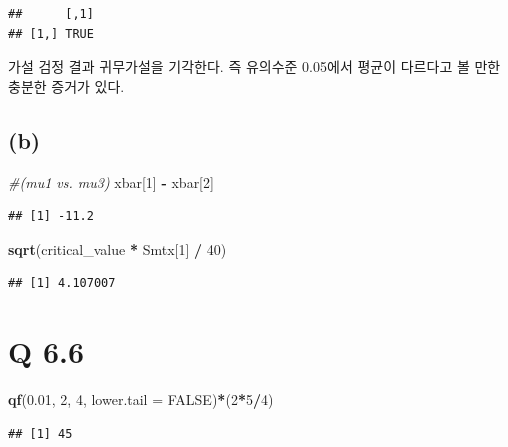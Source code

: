 \documentclass[
]{article}
\newenvironment{Shaded}{\begin{snugshade}}{\end{snugshade}}
\newcommand{\AttributeTok}[1]{\textcolor[rgb]{0.13,0.29,0.53}{#1}}
\newcommand{\CommentTok}[1]{\textcolor[rgb]{0.56,0.35,0.01}{\textit{#1}}}
\newcommand{\ConstantTok}[1]{\textcolor[rgb]{0.56,0.35,0.01}{#1}}
\newcommand{\DecValTok}[1]{\textcolor[rgb]{0.00,0.00,0.81}{#1}}
\newcommand{\FloatTok}[1]{\textcolor[rgb]{0.00,0.00,0.81}{#1}}
\newcommand{\FunctionTok}[1]{\textcolor[rgb]{0.13,0.29,0.53}{\textbf{#1}}}
\newcommand{\NormalTok}[1]{#1}
\newcommand{\SpecialCharTok}[1]{\textcolor[rgb]{0.81,0.36,0.00}{\textbf{#1}}}
\begin{document}
\begin{verbatim}
##      [,1]
## [1,] TRUE
\end{verbatim}

가설 검정 결과 귀무가설을 기각한다. 즉 유의수준 0.05에서 평균이 다르다고
볼 만한 충분한 증거가 있다.

\subsection{(b)}\label{b-1}

\begin{Shaded}
\begin{Highlighting}[]
\CommentTok{\#(mu1 vs. mu3)}
\NormalTok{xbar[}\DecValTok{1}\NormalTok{] }\SpecialCharTok{{-}}\NormalTok{ xbar[}\DecValTok{2}\NormalTok{]}
\end{Highlighting}
\end{Shaded}

\begin{verbatim}
## [1] -11.2
\end{verbatim}

\begin{Shaded}
\begin{Highlighting}[]
\FunctionTok{sqrt}\NormalTok{(critical\_value }\SpecialCharTok{*}\NormalTok{ Smtx[}\DecValTok{1}\NormalTok{] }\SpecialCharTok{/} \DecValTok{40}\NormalTok{)}
\end{Highlighting}
\end{Shaded}

\begin{verbatim}
## [1] 4.107007
\end{verbatim}

\section{Q 6.6}\label{q-6.6}

\begin{Shaded}
\begin{Highlighting}[]
\FunctionTok{qf}\NormalTok{(}\FloatTok{0.01}\NormalTok{, }\DecValTok{2}\NormalTok{, }\DecValTok{4}\NormalTok{, }\AttributeTok{lower.tail =} \ConstantTok{FALSE}\NormalTok{)}\SpecialCharTok{*}\NormalTok{(}\DecValTok{2}\SpecialCharTok{*}\DecValTok{5}\SpecialCharTok{/}\DecValTok{4}\NormalTok{)}
\end{Highlighting}
\end{Shaded}

\begin{verbatim}
## [1] 45
\end{verbatim}
\end{document}

